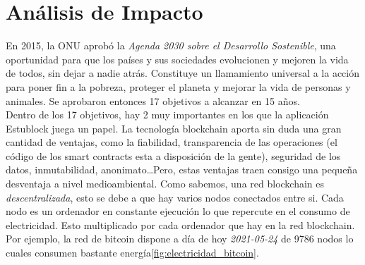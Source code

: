 \chapter{Análisis de Impacto}
\label{cap:ImpactoMedioAmbiente}

En 2015, la ONU aprobó la \emph{Agenda 2030 sobre el Desarrollo Sostenible}\cite{agenda2030}, una oportunidad para que los países y sus sociedades evolucionen y mejoren la vida de todos, sin dejar a nadie atrás. Constituye un llamamiento universal a la acción para poner fin a la pobreza, proteger el planeta y mejorar la vida de personas y animales. Se aprobaron entonces 17 objetivos\cite{17objetivos} a alcanzar en 15 años. \\

Dentro de los 17 objetivos, hay 2 muy importantes en los que la aplicación Estublock juega un papel. La tecnología blockchain aporta sin duda una gran cantidad de ventajas, como la fiabilidad, transparencia de las operaciones (el código de los smart contracts esta a disposición de la gente), seguridad de los datos, inmutabilidad, anonimato\dots Pero, estas ventajas traen consigo una pequeña desventaja a nivel medioambiental. Como sabemos, una red blockchain es \emph{descentralizada}, esto se debe a que hay varios nodos conectados entre si. Cada nodo es un ordenador en constante ejecución lo que repercute en el consumo de electricidad. Esto multiplicado por cada ordenador que hay en la red blockchain. Por ejemplo, la red de bitcoin dispone a día de hoy \textit{2021-05-24} de 9786 nodos\cite{bitcoinNodos} lo cuales consumen bastante energía\ref{fig:electricidad_bitcoin}. \\

